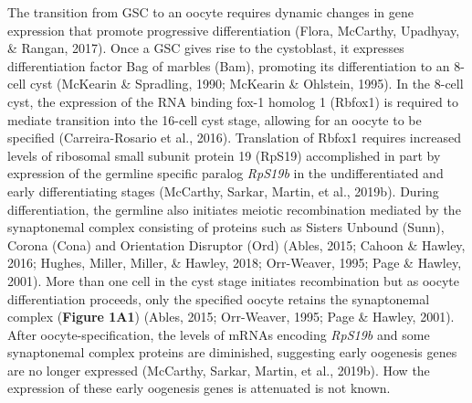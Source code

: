 \documentclass[12pt,oneside]{reedthesis}
\begin{document}
The transition from GSC to an oocyte requires dynamic changes in gene
expression that promote progressive differentiation
(Flora, McCarthy, Upadhyay, \& Rangan, 2017). Once a GSC gives rise to the
cystoblast, it expresses differentiation factor Bag of marbles (Bam),
promoting its differentiation to an 8-cell cyst
(McKearin \& Spradling, 1990; McKearin \& Ohlstein, 1995). In the 8-cell cyst, the
expression of the RNA binding fox-1 homolog 1 (Rbfox1) is required to
mediate transition into the 16-cell cyst stage, allowing for an oocyte
to be specified (Carreira-Rosario et al., 2016).
Translation of Rbfox1 requires increased levels of ribosomal small
subunit protein 19 (RpS19) accomplished in part by expression of the
germline specific paralog \emph{RpS19b} in the undifferentiated and early
differentiating stages
(McCarthy, Sarkar, Martin, et al., 2019b). During
differentiation, the germline also initiates meiotic recombination
mediated by the synaptonemal complex consisting of proteins such as
Sisters Unbound (Sunn), Corona (Cona) and Orientation Disruptor (Ord)
(Ables, 2015; Cahoon \& Hawley, 2016; Hughes, Miller, Miller, \& Hawley, 2018; Orr-Weaver, 1995; Page \& Hawley, 2001). More than one cell in the
cyst stage initiates recombination but as oocyte differentiation
proceeds, only the specified oocyte retains the synaptonemal complex
(\textbf{Figure 1A1}) (Ables, 2015; Orr-Weaver, 1995; Page \& Hawley, 2001). After oocyte-specification,
the levels of mRNAs encoding \emph{RpS19b} and some synaptonemal complex
proteins are diminished, suggesting early oogenesis genes are no longer
expressed (McCarthy, Sarkar, Martin, et al., 2019b). How the
expression of these early oogenesis genes is attenuated is not known.
\end{document}
